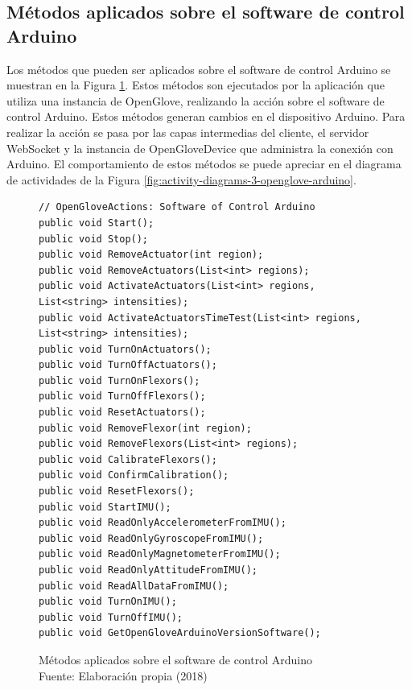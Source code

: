 \subsection{Métodos aplicados sobre el software de control Arduino}
\label{subsection:method-openglove-arduino}
Los métodos que pueden ser aplicados sobre el software de control Arduino se muestran en la Figura \ref{fig:methods-3-openglove-arduino}. Estos métodos son ejecutados por la aplicación que utiliza una instancia de OpenGlove, realizando la acción sobre el software de control Arduino. Estos métodos generan cambios en el dispositivo Arduino. Para realizar la acción se pasa por las capas intermedias del cliente, el servidor WebSocket y la instancia de OpenGloveDevice que administra la conexión con Arduino. El comportamiento de estos métodos se puede apreciar en el diagrama de actividades de la Figura \ref{fig:activity-diagrams-3-openglove-arduino}.


\begin{figure}[H]
  \begin{center} 
\begin{lstlisting}
// OpenGloveActions: Software of Control Arduino
public void Start();
public void Stop();
public void RemoveActuator(int region);
public void RemoveActuators(List<int> regions);
public void ActivateActuators(List<int> regions, List<string> intensities);
public void ActivateActuatorsTimeTest(List<int> regions, List<string> intensities);
public void TurnOnActuators();
public void TurnOffActuators();
public void TurnOnFlexors();
public void TurnOffFlexors();
public void ResetActuators();
public void RemoveFlexor(int region);
public void RemoveFlexors(List<int> regions);
public void CalibrateFlexors();
public void ConfirmCalibration();
public void ResetFlexors();
public void StartIMU();
public void ReadOnlyAccelerometerFromIMU();
public void ReadOnlyGyroscopeFromIMU();
public void ReadOnlyMagnetometerFromIMU();
public void ReadOnlyAttitudeFromIMU();
public void ReadAllDataFromIMU();
public void TurnOnIMU();
public void TurnOffIMU();
public void GetOpenGloveArduinoVersionSoftware();
\end{lstlisting}
   	\captionsetup{justification=centering}
    \caption[Métodos aplicados sobre el software de control Arduino]{Métodos aplicados sobre el software de control Arduino\\Fuente: Elaboración propia (2018)}
    \label{fig:methods-3-openglove-arduino}
  \end{center}
\end{figure}



